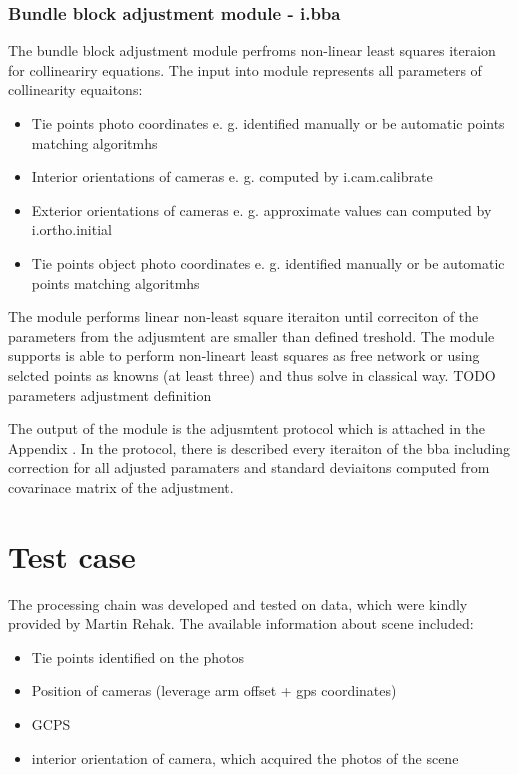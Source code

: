 \documentclass[a4paper,12pt]{report}
\begin{document}
\subsection{Bundle block adjustment module - i.bba}

The bundle block adjustment module perfroms non-linear least squares iteraion for collineariry equations. 
The input into module represents all parameters of collinearity equaitons:
\begin{itemize}
\item Tie points photo coordinates e. g. identified manually or be automatic points matching algoritmhs
\item Interior orientations of cameras e. g. computed by i.cam.calibrate
\item Exterior orientations of cameras e. g. approximate values can computed by i.ortho.initial
\item Tie points object photo coordinates e. g. identified manually or be automatic points matching algoritmhs
\end{itemize}

The module performs linear non-least square iteraiton until correciton of the parameters from the adjusmtent are smaller than
defined treshold. The module supports is able to perform non-lineart least squares as free network or using selcted points 
as knowns (at least three) and thus solve in classical way.
TODO parameters adjustment definition


The output of the module is the adjusmtent protocol which is attached in the Appendix \cite{sec:adj_protocol}. In the protocol, there
is described every iteraiton of the bba including correction for all adjusted paramaters and standard deviaitons computed from 
covarinace matrix of the adjustment. 




\chapter{Test case}

The processing chain was developed and tested on data, which were kindly provided by Martin Rehak. The available 
information about scene included:

\begin{itemize}
\item Tie points identified on the photos
\item Position of cameras (leverage arm offset + gps coordinates)
\item GCPS
\item interior orientation of camera, which acquired the photos of the scene
\end{itemize}
\end{document}
